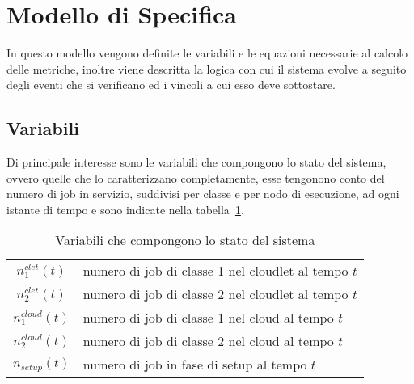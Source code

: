 \section{Modello di Specifica}
In questo modello vengono definite le variabili e le equazioni necessarie al
calcolo delle metriche, inoltre viene descritta la logica con cui il sistema
evolve a seguito degli eventi che si verificano ed i vincoli a cui esso deve
sottostare.
%
%
\subsection{Variabili}
Di principale interesse sono le variabili che compongono lo stato del sistema,
ovvero quelle che lo caratterizzano completamente, esse tengonono conto del
numero di job in servizio, suddivisi per classe e per nodo di esecuzione, ad
ogni istante di tempo e sono indicate nella tabella~\ref{state}.
%
\begin{table}[!h]
\begin{tabular}{c|l}
{$n_1^{clet}(t)$}  & numero di job di classe 1 nel cloudlet al tempo $t$\\
{$n_2^{clet}(t)$}  & numero di job di classe 2 nel cloudlet al tempo $t$\\
{$n_1^{cloud}(t)$} & numero di job di classe 1 nel cloud al tempo $t$\\
{$n_2^{cloud}(t)$} & numero di job di classe 2 nel cloud al tempo $t$\\
{$n_{setup}(t)$}   & numero di job in fase di setup al tempo $t$\\
\end{tabular}
\centering
\caption{Variabili che compongono lo stato del sistema}
\label{state}
\end{table}
%

